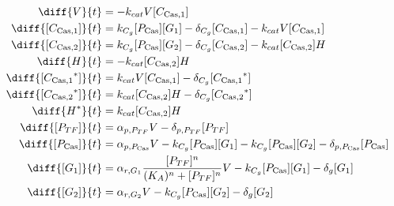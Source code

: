 \begin{align}
\diff{\vectorGen{}}{t} & = - \casCutRate{{}}\vectorGen{}\conc{\cplx{\cas}{1}}\\
\diff{\conc{\cplx{\cas}{1}}}{t} & =  \gRnaBind{}\conc{\proSp{\cas{}}}\conc{\gRna{1}} - \casCompDegradeRate{}\conc{\cplx{\cas}{1}} - \casCutRate{{}}\vectorGen{}\conc{\cplx{\cas}{1}}\\
\diff{\conc{\cplx{\cas}{2}}}{t} & =  \gRnaBind{}\conc{\proSp{\cas{}}}\conc{\gRna{2}} - \casCompDegradeRate{}\conc{\cplx{\cas}{2}} - \casCutRate{{}}\conc{\cplx{\cas}{2}}\hostGen{}\\
\diff{\hostGen{}}{t} & = - \casCutRate{{}}\conc{\cplx{\cas}{2}}\hostGen{}\\
\diff{\conc{\bound{\cplx{\cas}{1}}}}{t} & =  \casCutRate{{}}\vectorGen{}\conc{\cplx{\cas}{1}} - \casCompDegradeRate{}\conc{\bound{\cplx{\cas}{1}}}\\
\diff{\conc{\bound{\cplx{\cas}{2}}}}{t} & =  \casCutRate{{}}\conc{\cplx{\cas}{2}}\hostGen{} - \casCompDegradeRate{}\conc{\bound{\cplx{\cas}{2}}}\\
\diff{\edited{\hostGen{}}}{t} & =  \casCutRate{{}}\conc{\cplx{\cas}{2}}\hostGen{}\\
\diff{\conc{\proSp{TF}}}{t} & =  \txtlRate{\proSp{TF}}\vectorGen{} - \proDegradeRate{\proSp{TF}}\conc{\proSp{TF}}\\
\diff{\conc{\proSp{\cas{}}}}{t} & =  \txtlRate{\proSp{\cas{}}}\vectorGen{} - \gRnaBind{}\conc{\proSp{\cas{}}}\conc{\gRna{1}} - \gRnaBind{}\conc{\proSp{\cas{}}}\conc{\gRna{2}} - \proDegradeRate{\proSp{\cas{}}}\conc{\proSp{\cas{}}}\\
\diff{\conc{\gRna{1}}}{t} & =  \txRate{\gRna{1}}\frac{\conc{\proSp{TF}}^n}{(K_A)^n + \conc{\proSp{TF}}^n}\vectorGen{} - \gRnaBind{}\conc{\proSp{\cas{}}}\conc{\gRna{1}} - \rnaDegradeRate{}\conc{\gRna{1}}\\
\diff{\conc{\gRna{2}}}{t} & =  \txRate{\gRna{2}}\vectorGen{} - \gRnaBind{}\conc{\proSp{\cas{}}}\conc{\gRna{2}} - \rnaDegradeRate{}\conc{\gRna{2}}
\end{align}

